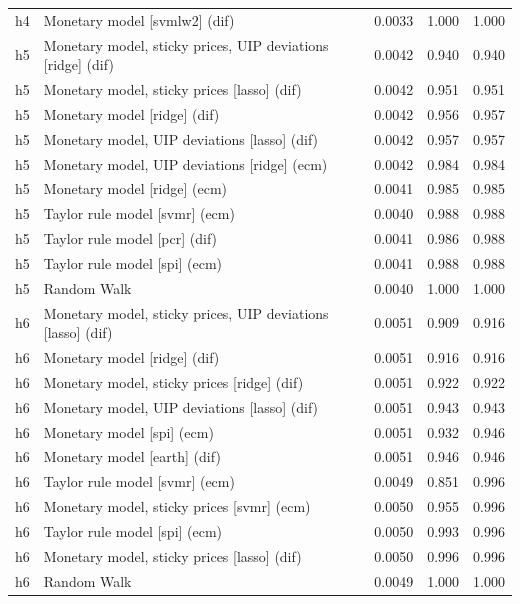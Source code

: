 \begin{ThreePartTable}
\begin{longtable}[t]{cp{5.5cm}ccc}
h4 & \raggedright Monetary model [svmlw2] (dif) & 0.0033 & 1.000 & 1.000\\
\addlinespace
h5 & \raggedright Monetary model, sticky prices, UIP deviations [ridge] (dif) & 0.0042 & 0.940 & 0.940\\
h5 & \raggedright Monetary model, sticky prices [lasso] (dif) & 0.0042 & 0.951 & 0.951\\
h5 & \raggedright Monetary model [ridge] (dif) & 0.0042 & 0.956 & 0.957\\
h5 & \raggedright Monetary model, UIP deviations [lasso] (dif) & 0.0042 & 0.957 & 0.957\\
h5 & \raggedright Monetary model, UIP deviations [ridge] (ecm) & 0.0042 & 0.984 & 0.984\\
h5 & \raggedright Monetary model [ridge] (ecm) & 0.0041 & 0.985 & 0.985\\
h5 & \raggedright Taylor rule model [svmr] (ecm) & 0.0040 & 0.988 & 0.988\\
h5 & \raggedright Taylor rule model [pcr] (dif) & 0.0041 & 0.986 & 0.988\\
h5 & \raggedright Taylor rule model [spi] (ecm) & 0.0041 & 0.988 & 0.988\\
h5 & \raggedright Random Walk & 0.0040 & 1.000 & 1.000\\
\addlinespace
h6 & \raggedright Monetary model, sticky prices, UIP deviations [lasso] (dif) & 0.0051 & 0.909 & 0.916\\
h6 & \raggedright Monetary model [ridge] (dif) & 0.0051 & 0.916 & 0.916\\
h6 & \raggedright Monetary model, sticky prices [ridge] (dif) & 0.0051 & 0.922 & 0.922\\
h6 & \raggedright Monetary model, UIP deviations [lasso] (dif) & 0.0051 & 0.943 & 0.943\\
h6 & \raggedright Monetary model [spi] (ecm) & 0.0051 & 0.932 & 0.946\\
h6 & \raggedright Monetary model [earth] (dif) & 0.0051 & 0.946 & 0.946\\
h6 & \raggedright Taylor rule model [svmr] (ecm) & 0.0049 & 0.851 & 0.996\\
h6 & \raggedright Monetary model, sticky prices [svmr] (ecm) & 0.0050 & 0.955 & 0.996\\
h6 & \raggedright Taylor rule model [spi] (ecm) & 0.0050 & 0.993 & 0.996\\
h6 & \raggedright Monetary model, sticky prices [lasso] (dif) & 0.0050 & 0.996 & 0.996\\
h6 & \raggedright Random Walk & 0.0049 & 1.000 & 1.000\\

\end{longtable}
\end{ThreePartTable}
